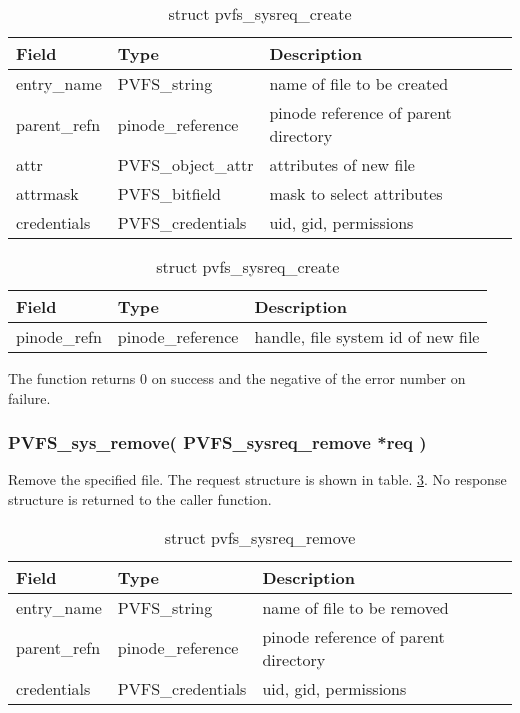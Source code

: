 \documentclass[11pt, letterpaper]{article}
\begin{document}
\begin{table}[H]
\begin{tabular}{|l|l|l|}
\hline
Field & Type & Description \\
\hline
\hline
entry\_name & PVFS\_string & name of file to be created \\
\hline
parent\_refn & pinode\_reference & pinode reference of parent directory
\\
\hline
attr & PVFS\_object\_attr & attributes of new file \\
\hline
attrmask & PVFS\_bitfield & mask to select attributes \\
\hline
credentials & PVFS\_credentials & uid, gid, permissions \\
\hline
\end{tabular}
\caption{struct pvfs\_sysreq\_create}\label{tab:reqcreate}
\end{table}

\begin{table}[H]
\begin{tabular}{|l|l|l|}
\hline
Field & Type & Description \\
\hline
\hline
pinode\_refn & pinode\_reference & handle, file system id of new file \\
\hline
\end{tabular}
\caption{struct pvfs\_sysreq\_create}\label{tab:respcreate}
\end{table}

The function returns 0 on success and the negative of the error
number on failure.

\subsubsection{PVFS\_sys\_remove(
PVFS\_sysreq\_remove *req
)}

Remove the specified file. The request structure is shown in table.
 \ref{tab:reqrem}. No response structure is returned to the caller
function.

\begin{table}[H]
\begin{tabular}{|l|l|l|}
\hline
Field & Type & Description \\
\hline
\hline
entry\_name & PVFS\_string & name of file to be removed \\
\hline
parent\_refn & pinode\_reference & pinode reference of parent directory
\\
credentials & PVFS\_credentials & uid, gid, permissions \\
\hline
\end{tabular}
\caption{struct pvfs\_sysreq\_remove}\label{tab:reqrem}
\end{table}
\end{document}
